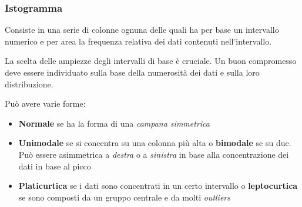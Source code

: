\subsubsection{Istogramma}
Consiste in una serie di colonne ognuna delle quali ha per base un intervallo numerico e per area la frequenza relativa dei dati contenuti nell'intervallo.
\begin{observation}
	La scelta delle ampiezze degli intervalli di base è cruciale. Un buon compromesso deve essere individuato sulla base della numerosità dei dati e sulla loro distribuzione.
\end{observation}
Può avere varie forme:
\begin{itemize}
	\item \textbf{Normale} se ha la forma di una \textit{campana simmetrica}
	\item \textbf{Unimodale} se si concentra su una colonna più alta o \textbf{bimodale} se su due. Può essere asimmetrica a \textit{destra} o a \textit{sinistra} in base alla concentrazione dei dati in base al picco
	\item \textbf{Platicurtica} se i dati sono concentrati in un certo intervallo o \textbf{leptocurtica} se sono composti da un gruppo centrale e da molti \textit{outliers}
\end{itemize}

